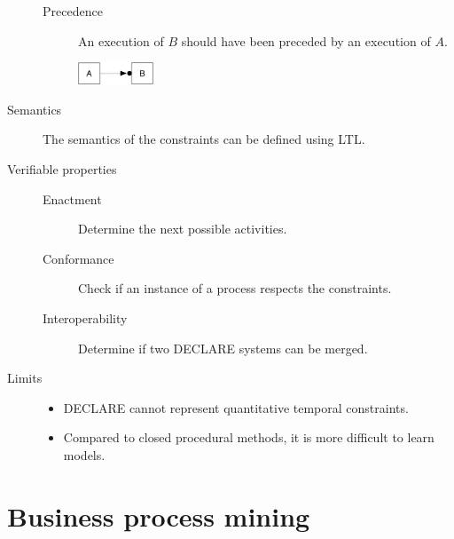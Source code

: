 \begin{description}
\begin{description}
            \item[Precedence] 
                An execution of $B$ should have been preceded by an execution of $A$.
                \begin{center}
                    \includegraphics[width=0.2\textwidth]{img/declare_precedence.png}
                \end{center}
        \end{description}

    \item[Semantics]
        The semantics of the constraints can be defined using LTL.

    \item[Verifiable properties] \phantom{}
        \begin{description}
            \item[Enactment]  
                Determine the next possible activities.
            \item[Conformance]  
                Check if an instance of a process respects the constraints.
            \item[Interoperability]  
                Determine if two DECLARE systems can be merged.
        \end{description}

    \item[Limits] \phantom{}
        \begin{itemize}
            \item DECLARE cannot represent quantitative temporal constraints.
            \item Compared to closed procedural methods, it is more difficult to learn models.
        \end{itemize}
\end{description}



\section{Business process mining}

